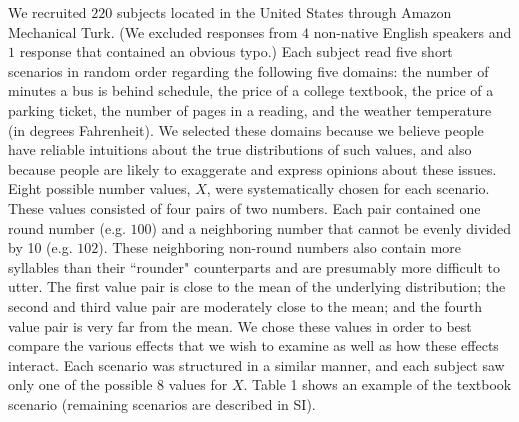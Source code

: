 \documentclass{article} %
\begin{document}
We recruited $220$ subjects located in the United States through Amazon Mechanical Turk. (We excluded responses from $4$ non-native English speakers and $1$ response that contained an obvious typo.) Each subject read five short scenarios in random order regarding the following five domains: the number of minutes a bus is behind schedule, the price of a college textbook, the price of a parking ticket, the number of pages in a reading, and the weather temperature (in degrees Fahrenheit). We selected these domains because we believe people have reliable intuitions about the true distributions of such values, and also because people are likely to exaggerate and express opinions about these issues. Eight possible number values, $X$, were systematically chosen for each scenario. These values consisted of four pairs of two numbers. Each pair contained one round number (e.g. $100$) and a neighboring number that cannot be evenly divided by 10 (e.g. $102$). These neighboring non-round numbers also contain more syllables than their ``rounder" counterparts and are presumably more difficult to utter. The first value pair is close to the mean of the underlying distribution; the second and third value pair are moderately close to the mean; and the fourth value pair is very far from the mean. We chose these values in order to best compare the various effects that we wish to examine as well as how these effects interact. Each scenario was structured in a similar manner, and each subject saw only one of the possible $8$ values for $X$. Table 1 shows an example of the textbook scenario (remaining  scenarios are described in SI).
\end{document}
